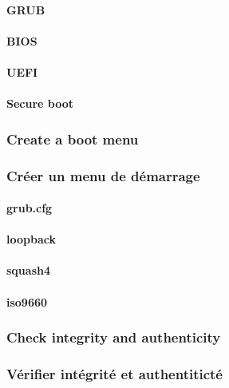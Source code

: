 \paragraph{GRUB}

\paragraph{BIOS}

\paragraph{UEFI}

\paragraph{Secure boot}

\ml
{\subsubsection{Create a boot menu}}
{\subsubsection{Créer un menu de démarrage}}

\paragraph{grub.cfg}

\paragraph{loopback}

\paragraph{squash4}

\paragraph{iso9660}

\ml
{\subsubsection{Check integrity and authenticity}}
{\subsubsection{Vérifier intégrité et authentiticté}}

